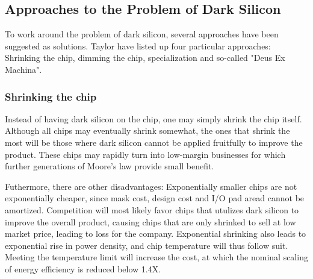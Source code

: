 \subsection{Approaches to the Problem of Dark Silicon}
\label{sec:taylor}

To work around the problem of dark silicon, several approaches have been suggested as solutions.
Taylor\cite{dark-silicon} have listed up four particular approaches: Shrinking the chip, dimming the chip, specialization and so-called "Deus Ex Machina".



\subsubsection{Shrinking the chip}

Instead of having dark silicon on the chip, one may simply shrink the chip itself.
Although all chips may eventually shrink somewhat, the ones that shrink the most will be those where dark silicon cannot be applied fruitfully to improve the product.
These chips may rapidly turn into low-margin businesses for which further generations of Moore’s law provide small benefit.

Futhermore, there are other disadvantages: Exponentially smaller chips are not exponentially cheaper, since mask cost, design cost and I/O pad aread cannot be amortized. 
Competition will most likely favor chips that utulizes dark silicon to improve the overall product, causing chips that are only shrinked to sell at low market price, leading to loss for the company.
Exponential shrinking also leads to exponential rise in power density, and chip temperature will thus follow suit.
Meeting the temperature limit will increase the cost, at which the nominal scaling of energy efficiency is reduced below 1.4X.

